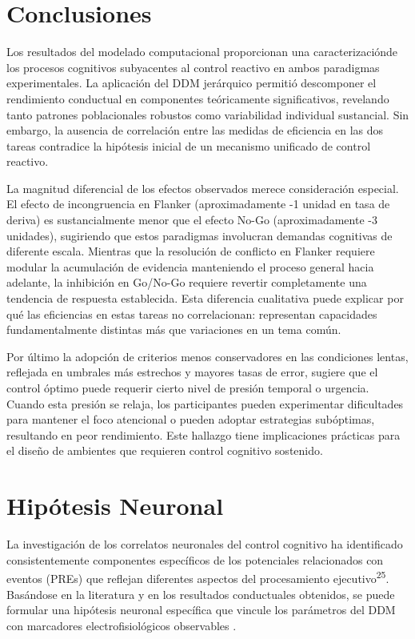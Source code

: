 \documentclass[
  spanish,
  10pt,
]{article}
\begin{document}
\section{Conclusiones}\label{conclusiones}

Los resultados del modelado computacional proporcionan una
caracterizaciónde los procesos cognitivos subyacentes al control
reactivo en ambos paradigmas experimentales. La aplicación del DDM
jerárquico permitió descomponer el rendimiento conductual en componentes
teóricamente significativos, revelando tanto patrones poblacionales
robustos como variabilidad individual sustancial. Sin embargo, la
ausencia de correlación entre las medidas de eficiencia en las dos
tareas contradice la hipótesis inicial de un mecanismo unificado de
control reactivo.

La magnitud diferencial de los efectos observados merece consideración
especial. El efecto de incongruencia en Flanker (aproximadamente -1
unidad en tasa de deriva) es sustancialmente menor que el efecto No-Go
(aproximadamente -3 unidades), sugiriendo que estos paradigmas
involucran demandas cognitivas de diferente escala. Mientras que la
resolución de conflicto en Flanker requiere modular la acumulación de
evidencia manteniendo el proceso general hacia adelante, la inhibición
en Go/No-Go requiere revertir completamente una tendencia de respuesta
establecida. Esta diferencia cualitativa puede explicar por qué las
eficiencias en estas tareas no correlacionan: representan capacidades
fundamentalmente distintas más que variaciones en un tema común.

Por último la adopción de criterios menos conservadores en las
condiciones lentas, reflejada en umbrales más estrechos y mayores tasas
de error, sugiere que el control óptimo puede requerir cierto nivel de
presión temporal o urgencia. Cuando esta presión se relaja, los
participantes pueden experimentar dificultades para mantener el foco
atencional o pueden adoptar estrategias subóptimas, resultando en peor
rendimiento. Este hallazgo tiene implicaciones prácticas para el diseño
de ambientes que requieren control cognitivo sostenido.

\section{Hipótesis Neuronal}\label{hipuxf3tesis-neuronal}

La investigación de los correlatos neuronales del control cognitivo ha
identificado consistentemente componentes específicos de los potenciales
relacionados con eventos (PREs) que reflejan diferentes aspectos del
procesamiento ejecutivo\textsuperscript{25}. Basándose en la literatura
y en los resultados conductuales obtenidos, se puede formular una
hipótesis neuronal específica que vincule los parámetros del DDM con
marcadores electrofisiológicos observables .
\end{document}
